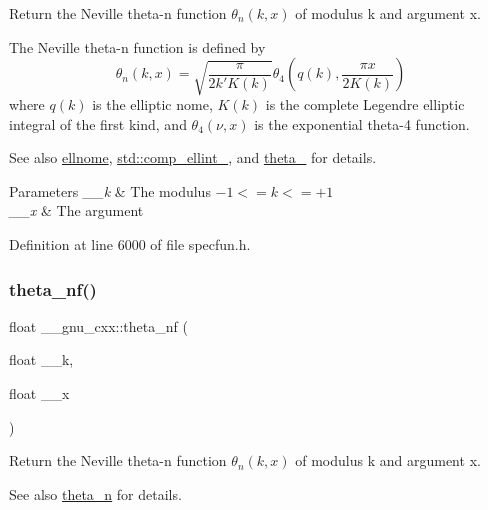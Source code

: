 Return the Neville theta-\/n function $ \theta_n(k,x) $ of modulus {\ttfamily k} and argument {\ttfamily x}.

The Neville theta-\/n function is defined by \[ \theta_n(k,x) = \sqrt{\frac{\pi}{2k'K(k)}} \theta_4\left(q(k),\frac{\pi x}{2K(k)}\right) \] where $ q(k) $ is the elliptic nome, $ K(k) $ is the complete Legendre elliptic integral of the first kind, and $ \theta_4(\nu,x) $ is the exponential theta-\/4 function. \begin{DoxySeeAlso}{See also}
\hyperlink{group__mathsf__gnu_ga7bfb34f8b5c0ed7c72040f9cb7034bba}{ellnome}, \hyperlink{group__mathsf__std_gad559217fb01e7a8b7a6e23eeedda64be}{std\+::comp\+\_\+ellint\+\_}, and \hyperlink{group__mathsf__gnu_ga8a6f8b69272a9f205a13e1745832ada3}{theta\+\_} for details.
\end{DoxySeeAlso}

\begin{DoxyParams}{Parameters}
{\em \+\_\+\+\_\+k} & The modulus $ -1 <= k <= +1 $ \\
\hline
{\em \+\_\+\+\_\+x} & The argument \\
\hline
\end{DoxyParams}


Definition at line 6000 of file specfun.\+h.

\mbox{\label{group__mathsf__gnu_ga5298a95e02bd909d55e59c1f2a0b51f8}} 
\subsubsection{\texorpdfstring{theta\+\_\+nf()}{theta\_nf()}}
{\footnotesize\ttfamily float \+\_\+\+\_\+gnu\+\_\+cxx\+::theta\+\_\+nf (\begin{DoxyParamCaption}\item[{float}]{\+\_\+\+\_\+k,  }\item[{float}]{\+\_\+\+\_\+x }\end{DoxyParamCaption})\hspace{0.3cm}{\ttfamily [inline]}}

Return the Neville theta-\/n function $ \theta_n(k,x) $ of modulus {\ttfamily k} and argument {\ttfamily x}.

\begin{DoxySeeAlso}{See also}
\hyperlink{group__mathsf__gnu_ga202778bd650e04e9f3729bfca35c32e2}{theta\+\_\+n} for details. 
\end{DoxySeeAlso}



